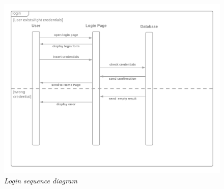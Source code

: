 \documentclass[table, 12pt]{article}
\begin{document}
\begin{figure}[H]
    \centering
    \includegraphics[scale=0.33]{assets/login.png}
    \caption{\textit{Login sequence diagram}}
\end{figure}
\end{document}

